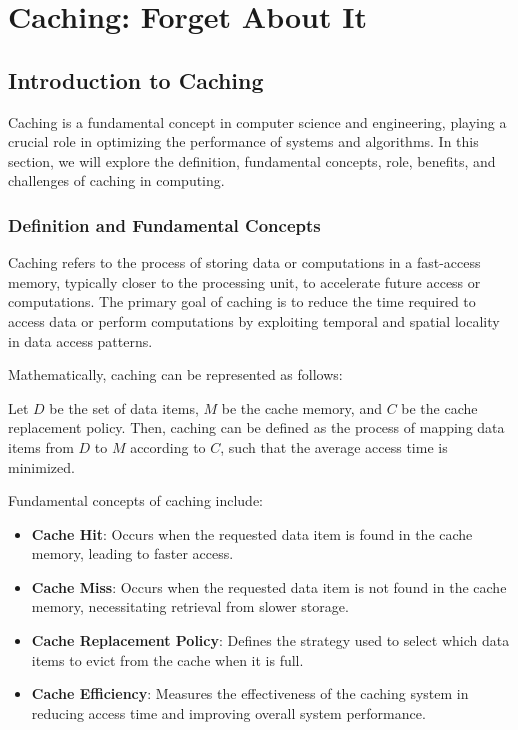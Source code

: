 \documentclass[12pt]{book} %
\begin{document}
\chapter{Caching: Forget About It}

\section{Introduction to Caching}

Caching is a fundamental concept in computer science and engineering, playing a crucial role in optimizing the performance of systems and algorithms. In this section, we will explore the definition, fundamental concepts, role, benefits, and challenges of caching in computing.

\subsection{Definition and Fundamental Concepts}

Caching refers to the process of storing data or computations in a fast-access memory, typically closer to the processing unit, to accelerate future access or computations. The primary goal of caching is to reduce the time required to access data or perform computations by exploiting temporal and spatial locality in data access patterns.

Mathematically, caching can be represented as follows:

Let \(D\) be the set of data items, \(M\) be the cache memory, and \(C\) be the cache replacement policy. Then, caching can be defined as the process of mapping data items from \(D\) to \(M\) according to \(C\), such that the average access time is minimized.

Fundamental concepts of caching include:

\begin{itemize}
    \item \textbf{Cache Hit}: Occurs when the requested data item is found in the cache memory, leading to faster access.
    \item \textbf{Cache Miss}: Occurs when the requested data item is not found in the cache memory, necessitating retrieval from slower storage.
    \item \textbf{Cache Replacement Policy}: Defines the strategy used to select which data items to evict from the cache when it is full.
    \item \textbf{Cache Efficiency}: Measures the effectiveness of the caching system in reducing access time and improving overall system performance.
\end{itemize}
\end{document}

